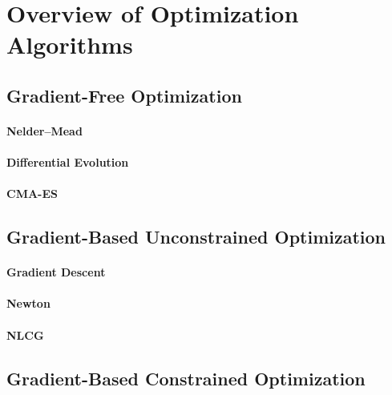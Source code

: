 \section{Overview of Optimization Algorithms}

\blindtext{}

\subsection{Gradient-Free Optimization}

\blindtext{}

\paragraph{Nelder--Mead}

\blindtext{}

\paragraph{Differential Evolution}

\blindtext{}

\paragraph{CMA-ES}

\blindtext{}

\subsection{Gradient-Based Unconstrained Optimization}

\blindtext{}

\paragraph{Gradient Descent}

\blindtext{}

\paragraph{Newton}

\blindtext{}

\paragraph{NLCG}

\blindtext{}

\subsection{Gradient-Based Constrained Optimization}

\blindtext{}
